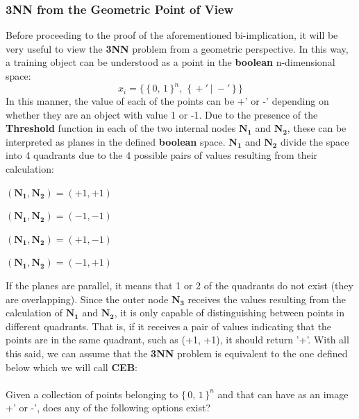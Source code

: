 \documentclass[../main]{subfiles}
\begin{document}
\subsubsection{3NN from the Geometric Point of View}
Before proceeding to the proof of the aforementioned bi-implication, it will be very useful to view the \textbf{3NN} problem from a geometric perspective. In this way, a training object can be understood as a point in the \textbf{boolean} n-dimensional space:
\begin{equation*}
    x_i = \{\,\{ \, 0,\, 1 \, \}^n, \, \,\{\, +' \ | \ -'\,\} \,\}
\end{equation*}
In this manner, the value of each of the points can be +' or -' depending on whether they are an object with value 1 or -1. Due to the presence of the \textbf{Threshold} function in each of the two internal nodes $\textbf{N}_\textbf{1}$ and $\textbf{N}_\textbf{2}$, these can be interpreted as planes in the defined \textbf{boolean} space. $\textbf{N}_\textbf{1}$ and $\textbf{N}_\textbf{2}$ divide the space into 4 quadrants due to the 4 possible pairs of values resulting from their calculation:
\begin{center} $(\textbf{N}_\textbf{1}, \textbf{N}_\textbf{2}
) = (+1, +1)$ \end{center}
\begin{center} $(\textbf{N}_\textbf{1}, \textbf{N}_\textbf{2}
) = (-1, -1)$ \end{center}
\begin{center} $(\textbf{N}_\textbf{1}, \textbf{N}_\textbf{2}
) = (+1, -1)$ \end{center}
\begin{center} $(\textbf{N}_\textbf{1}, \textbf{N}_\textbf{2}
) = (-1, +1)$ \end{center}
If the planes are parallel, it means that 1 or 2 of the quadrants do not exist (they are overlapping). Since the outer node $\textbf{N}_\textbf{3}$ receives the values resulting from the calculation of $\textbf{N}_\textbf{1}$ and $\textbf{N}_\textbf{2}$, it is only capable of distinguishing between points in different quadrants. That is, if it receives a pair of values indicating that the points are in the same quadrant, such as (+1, +1), it should return '+'. 
With all this said, we can assume that the \textbf{3NN} problem is equivalent to the one defined below which we will call \textbf{CEB}:\\\\
Given a collection of points belonging to $\{\, 0, \, 1 \, \}^n$ and that can have as an image +' or -', does any of the following options exist?\vspace{3mm}
\end{document}
